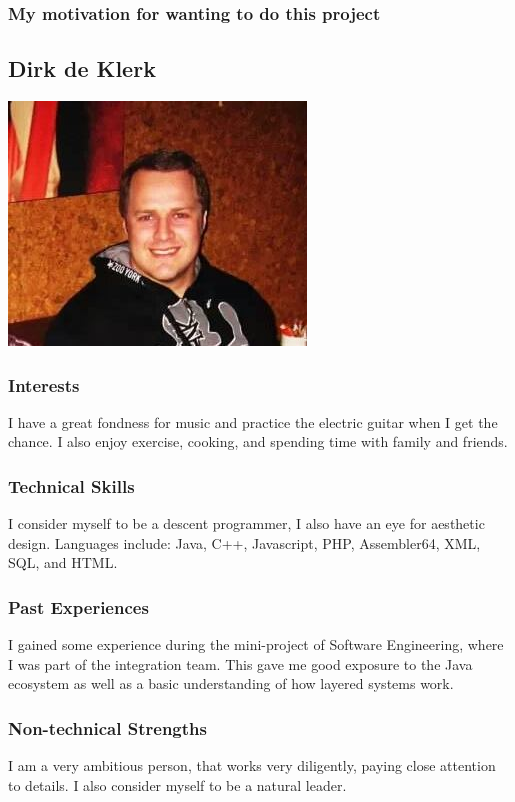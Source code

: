 \documentclass[a4paper,12pt]{article}
\begin{document}
			\subsubsection{My motivation for wanting to do this project}
		
		\newpage
		\subsection{Dirk de Klerk}
		\includegraphics[scale=0.8]{./Pictures/dirk.jpg}\\
			\subsubsection{Interests}
			I have a great fondness for music and practice the electric guitar when I get the chance. I also enjoy exercise, cooking, and spending time with family and friends.
			\subsubsection{Technical Skills}
			I consider myself to be a descent programmer, I also have an eye for aesthetic design. Languages include: Java, C++, Javascript, PHP, Assembler64, XML, SQL, and HTML. 
			\subsubsection{Past Experiences}
			I gained some experience during the mini-project of Software Engineering, where I was part of the integration team. This gave me good exposure to the Java ecosystem as well as a basic understanding of how layered systems work.
			\subsubsection{Non-technical Strengths}
			I am a very ambitious person, that works very diligently, paying close attention to details. I also consider myself to be a natural leader. 
\end{document}
